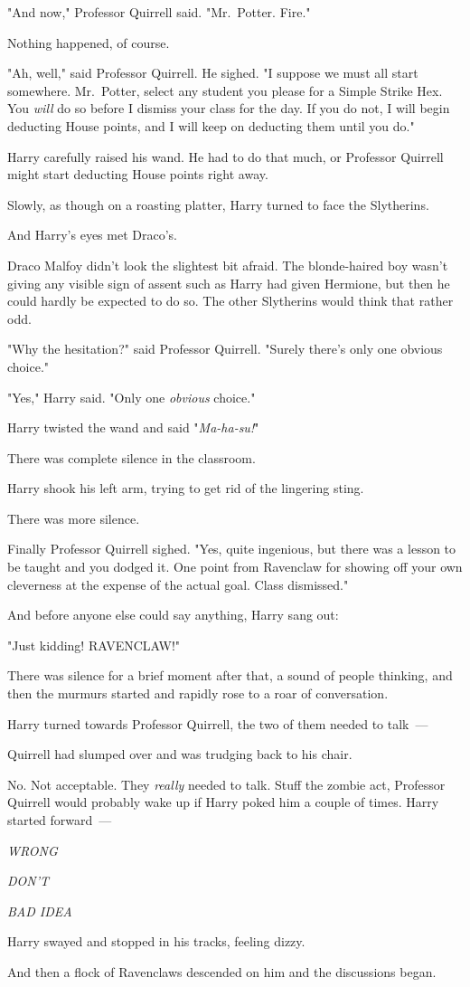 "And now," Professor Quirrell said. "Mr.~Potter. Fire."

Nothing happened, of course.

"Ah, well," said Professor Quirrell. He sighed. "I suppose we must all start
somewhere. Mr.~Potter, select any student you please for a Simple Strike Hex.
You \emph{will} do so before I dismiss your class for the day. If you do not, I
will begin deducting House points, and I will keep on deducting them until you
do."

Harry carefully raised his wand. He had to do that much, or Professor Quirrell
might start deducting House points right away.

Slowly, as though on a roasting platter, Harry turned to face the Slytherins.

And Harry's eyes met Draco's.

Draco Malfoy didn't look the slightest bit afraid. The blonde-haired boy wasn't
giving any visible sign of assent such as Harry had given Hermione, but then he
could hardly be expected to do so. The other Slytherins would think that rather
odd.

"Why the hesitation?" said Professor Quirrell. "Surely there's only one obvious
choice."

"Yes," Harry said. "Only one \emph{obvious} choice."

Harry twisted the wand and said "\emph{Ma-ha-su!}"

There was complete silence in the classroom.

Harry shook his left arm, trying to get rid of the lingering sting.

There was more silence.

Finally Professor Quirrell sighed. "Yes, quite ingenious, but there was a
lesson to be taught and you dodged it. One point from Ravenclaw for showing off
your own cleverness at the expense of the actual goal. Class dismissed."

And before anyone else could say anything, Harry sang out:

"Just kidding! RAVENCLAW!"

There was silence for a brief moment after that, a sound of people thinking,
and then the murmurs started and rapidly rose to a roar of conversation.

Harry turned towards Professor Quirrell, the two of them needed to talk~---

Quirrell had slumped over and was trudging back to his chair.

No. Not acceptable. They \emph{really} needed to talk. Stuff the zombie act,
Professor Quirrell would probably wake up if Harry poked him a couple of times.
Harry started forward~---

\emph{WRONG}

\emph{DON'T}

\emph{BAD IDEA}

Harry swayed and stopped in his tracks, feeling dizzy.

And then a flock of Ravenclaws descended on him and the discussions began.
